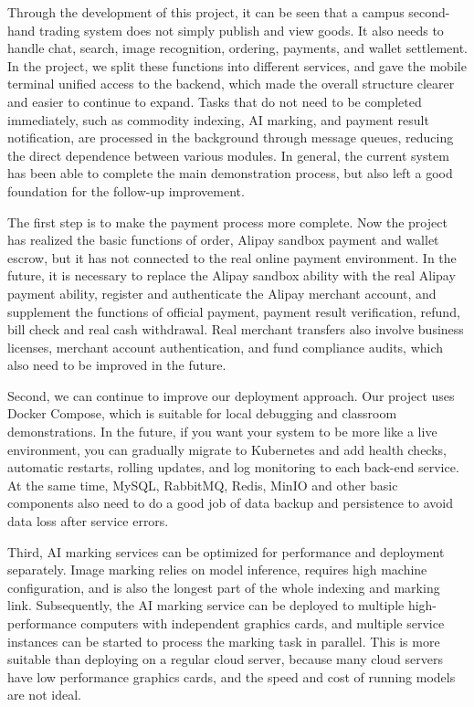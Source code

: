 \documentclass{article}
\begin{document}
Through the development of this project, it can be seen that a campus second-hand trading system does not simply publish and view goods. It also needs to handle chat, search, image recognition, ordering, payments, and wallet settlement. In the project, we split these functions into different services, and gave the mobile terminal unified access to the backend, which made the overall structure clearer and easier to continue to expand. Tasks that do not need to be completed immediately, such as commodity indexing, AI marking, and payment result notification, are processed in the background through message queues, reducing the direct dependence between various modules. In general, the current system has been able to complete the main demonstration process, but also left a good foundation for the follow-up improvement.

The first step is to make the payment process more complete. Now the project has realized the basic functions of order, Alipay sandbox payment and wallet escrow, but it has not connected to the real online payment environment. In the future, it is necessary to replace the Alipay sandbox ability with the real Alipay payment ability, register and authenticate the Alipay merchant account, and supplement the functions of official payment, payment result verification, refund, bill check and real cash withdrawal. Real merchant transfers also involve business licenses, merchant account authentication, and fund compliance audits, which also need to be improved in the future.

Second, we can continue to improve our deployment approach. Our project uses Docker Compose, which is suitable for local debugging and classroom demonstrations. In the future, if you want your system to be more like a live environment, you can gradually migrate to Kubernetes and add health checks, automatic restarts, rolling updates, and log monitoring to each back-end service. At the same time, MySQL, RabbitMQ, Redis, MinIO and other basic components also need to do a good job of data backup and persistence to avoid data loss after service errors.

Third, AI marking services can be optimized for performance and deployment separately. Image marking relies on model inference, requires high machine configuration, and is also the longest part of the whole indexing and marking link. Subsequently, the AI marking service can be deployed to multiple high-performance computers with independent graphics cards, and multiple service instances can be started to process the marking task in parallel. This is more suitable than deploying on a regular cloud server, because many cloud servers have low performance graphics cards, and the speed and cost of running models are not ideal.
\end{document}
